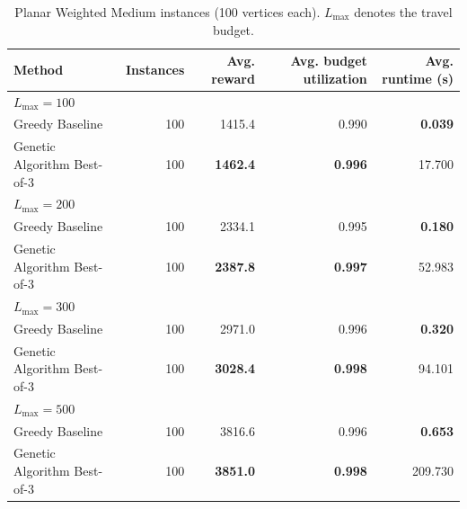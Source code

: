 \documentclass[report,english,cleveref,autoref,a4paper]{lipics-v2021}
\begin{document}
\begin{table}[ht]
\centering
\caption{Planar Weighted Medium instances (100 vertices each). $L_{\max}$ denotes the travel budget.}
\scriptsize
\setlength{\tabcolsep}{3pt}
\begin{tabular}{|l|r|r|r|r|}
\hline
Method & Instances & Avg. reward & Avg. budget utilization & Avg. runtime (s) \\
\hline
\multicolumn{5}{|l|}{$L_{\max}=100$} \\
\hline
Greedy Baseline & 100 & 1415.4 & 0.990 & \textbf{0.039} \\
\hline
Genetic Algorithm Best-of-3 & 100 & \textbf{1462.4} & \textbf{0.996} & 17.700 \\
\hline
\multicolumn{5}{|l|}{$L_{\max}=200$} \\
\hline
Greedy Baseline & 100 & 2334.1 & 0.995 & \textbf{0.180} \\
\hline
Genetic Algorithm Best-of-3 & 100 & \textbf{2387.8} & \textbf{0.997} & 52.983 \\
\hline
\multicolumn{5}{|l|}{$L_{\max}=300$} \\
\hline
Greedy Baseline & 100 & 2971.0 & 0.996 & \textbf{0.320} \\
\hline
Genetic Algorithm Best-of-3 & 100 & \textbf{3028.4} & \textbf{0.998} & 94.101 \\
\hline
\multicolumn{5}{|l|}{$L_{\max}=500$} \\
\hline
Greedy Baseline & 100 & 3816.6 & 0.996 & \textbf{0.653} \\
\hline
Genetic Algorithm Best-of-3 & 100 & \textbf{3851.0} & \textbf{0.998} & 209.730 \\
\hline
\end{tabular}
\label{tab:planar-weighted-medium-ttsp-results}
\end{table}
\end{document}
